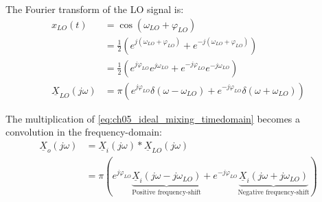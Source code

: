 \begin{refsection}
The Fourier transform of the \ac{LO} signal is:
\begin{equation}
	\begin{split}
		x_{LO}(t) &= \cos\left(\omega_{LO} + \varphi_{LO}\right) \\
		 &= \frac{1}{2}\left(e^{j\left(\omega_{LO} + \varphi_{LO}\right)} + e^{-j\left(\omega_{LO} + \varphi_{LO}\right)}\right) \\
		 &= \frac{1}{2}\left(e^{j \varphi_{LO}} e^{j \omega_{LO}} + e^{-j \varphi_{LO}} e^{-j \omega_{LO}}\right) \\
		\underline{X}_{LO}\left(j\omega\right) &= \pi \left( e^{j \varphi_{LO}} \delta\left(\omega - \omega_{LO}\right) + e^{-j \varphi_{LO}} \delta\left(\omega + \omega_{LO}\right) \right)
	\end{split}
\end{equation}

The multiplication of \eqref{eq:ch05_ideal_mixing_timedomain} becomes a convolution in the frequency-domain:
\begin{equation}
	\begin{split}
		\underline{X}_{o}\left(j\omega\right) &= \underline{X}_{i}\left(j\omega\right) * \underline{X}_{LO}\left(j\omega\right) \\
		 &= \pi \left( e^{j \varphi_{LO}} \underbrace{\underline{X}_{i}\left(j\omega - j \omega_{LO}\right)}_{\text{Positive frequency-shift}} + e^{-j \varphi_{LO}} \underbrace{\underline{X}_{i}\left(j\omega + j \omega_{LO}\right)}_{\text{Negative frequency-shift}} \right)
	\end{split}
\end{equation}


\end{refsection}

